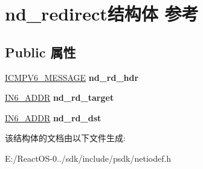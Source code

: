 \hypertarget{structnd__redirect}{}\section{nd\+\_\+redirect结构体 参考}
\label{structnd__redirect}
\subsection*{Public 属性}
\begin{DoxyCompactItemize}
\item 
\mbox{\label{structnd__redirect_a831b688e967d95ddc3ca995c6db7c4f5}} 
\hyperlink{struct___i_c_m_p___m_e_s_s_a_g_e}{I\+C\+M\+P\+V6\+\_\+\+M\+E\+S\+S\+A\+GE} {\bfseries nd\+\_\+rd\+\_\+hdr}
\item 
\mbox{\label{structnd__redirect_a766439ac9f500638328586e68c27b5c1}} 
\hyperlink{structin6__addr}{I\+N6\+\_\+\+A\+D\+DR} {\bfseries nd\+\_\+rd\+\_\+target}
\item 
\mbox{\label{structnd__redirect_a122ba1c31d10f173ec228b0b7def9600}} 
\hyperlink{structin6__addr}{I\+N6\+\_\+\+A\+D\+DR} {\bfseries nd\+\_\+rd\+\_\+dst}
\end{DoxyCompactItemize}


该结构体的文档由以下文件生成\+:\begin{DoxyCompactItemize}
\item 
E\+:/\+React\+O\+S-\/0../sdk/include/psdk/netiodef.\+h\end{DoxyCompactItemize}
